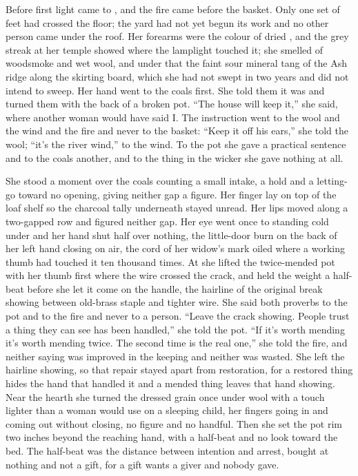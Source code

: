 Before first light  came to , and the fire came before the basket. Only one set of feet had crossed the floor; the yard had not yet begun its work and no other person came under the roof. Her forearms were the colour of dried , and the grey streak at her temple showed where the lamplight touched it; she smelled of woodsmoke and wet wool, and under that the faint sour mineral tang of the Ash ridge along the skirting board, which she had not swept in two years and did not intend to sweep. Her hand went to the coals first. She told them it was  and turned them with the back of a broken pot. “The house will keep it,” she said, where another woman would have said I. The instruction went to the wool and the wind and the fire and never to the basket: “Keep it off his ears,” she told the wool; “it's the river wind,” to the wind. To the pot she gave a practical sentence and to the coals another, and to the thing in the wicker she gave nothing at all.

She stood a moment over the coals counting a small intake, a hold and a letting-go toward no opening, giving neither gap a figure. Her finger lay on top of the loaf shelf so the charcoal tally underneath stayed unread. Her lips moved along a two-gapped row and figured neither gap. Her eye went once to  standing cold under  and her hand shut half over nothing, the little-door burn on the back of her left hand closing on air, the cord of her widow's mark oiled where a working thumb had touched it ten thousand times. At  she lifted the twice-mended pot with her thumb first where the wire crossed the crack, and held the weight a half-beat before she let it come on the handle, the hairline of the original break showing between old-brass staple and tighter wire. She said both proverbs to the pot and to the fire and never to a person. “Leave the crack showing. People trust a thing they can see has been handled,” she told the pot. “If it's worth mending it's worth mending twice. The second time is the real one,” she told the fire, and neither saying was improved in the keeping and neither was wasted. She left the hairline showing, so that repair stayed apart from restoration, for a restored thing hides the hand that handled it and a mended thing leaves that hand showing. Near the hearth she turned the dressed grain once under wool with a touch lighter than a woman would use on a sleeping child, her fingers going in and coming out without closing, no figure and no handful. Then she set the pot rim two inches beyond the reaching hand, with a half-beat and no look toward the bed. The half-beat was the distance between intention and arrest, bought at nothing and not a gift, for a gift wants a giver and nobody gave.

